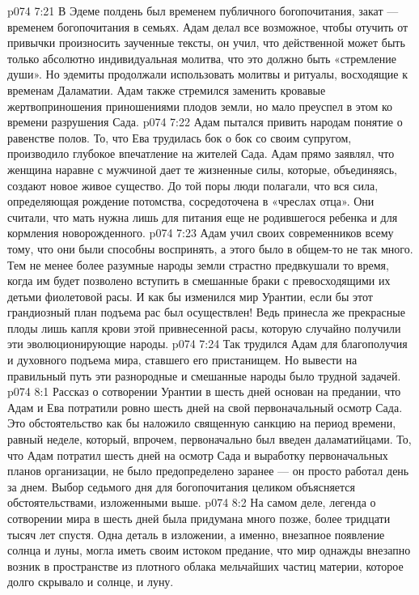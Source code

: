 \vs p074 7:21 В Эдеме полдень был временем публичного богопочитания, закат --- временем богопочитания в семьях. Адам делал все возможное, чтобы отучить от привычки произносить заученные тексты, он учил, что действенной может быть только абсолютно индивидуальная молитва, что это должно быть «стремление души». Но эдемиты продолжали использовать молитвы и ритуалы, восходящие к временам Даламатии. Адам также стремился заменить кровавые жертвоприношения приношениями плодов земли, но мало преуспел в этом ко времени разрушения Сада.
\vs p074 7:22 \pc Адам пытался привить народам понятие о равенстве полов. То, что Ева трудилась бок о бок со своим супругом, производило глубокое впечатление на жителей Сада. Адам прямо заявлял, что женщина наравне с мужчиной дает те жизненные силы, которые, объединяясь, создают новое живое существо. До той поры люди полагали, что вся сила, определяющая рождение потомства, сосредоточена в «чреслах отца». Они считали, что мать нужна лишь для питания еще не родившегося ребенка и для кормления новорожденного.
\vs p074 7:23 Адам учил своих современников всему тому, что они были способны воспринять, а этого было в общем\hyp{}то не так много. Тем не менее более разумные народы земли страстно предвкушали то время, когда им будет позволено вступить в смешанные браки с превосходящими их детьми фиолетовой расы. И как бы изменился мир Урантии, если бы этот грандиозный план подъема рас был осуществлен! Ведь принесла же прекрасные плоды лишь капля крови этой привнесенной расы, которую случайно получили эти эволюционирующие народы.
\vs p074 7:24 Так трудился Адам для благополучия и духовного подъема мира, ставшего его пристанищем. Но вывести на правильный путь эти разнородные и смешанные народы было трудной задачей.
\vs p074 8:1 Рассказ о сотворении Урантии в шесть дней основан на предании, что Адам и Ева потратили ровно шесть дней на свой первоначальный осмотр Сада. Это обстоятельство как бы наложило священную санкцию на период времени, равный неделе, который, впрочем, первоначально был введен даламатийцами. То, что Адам потратил шесть дней на осмотр Сада и выработку первоначальных планов организации, не было предопределено заранее --- он просто работал день за днем. Выбор седьмого дня для богопочитания целиком объясняется обстоятельствами, изложенными выше.
\vs p074 8:2 На самом деле, легенда о сотворении мира в шесть дней была придумана много позже, более тридцати тысяч лет спустя. Одна деталь в изложении, а именно, внезапное появление солнца и луны, могла иметь своим истоком предание, что мир однажды внезапно возник в пространстве из плотного облака мельчайших частиц материи, которое долго скрывало и солнце, и луну.
